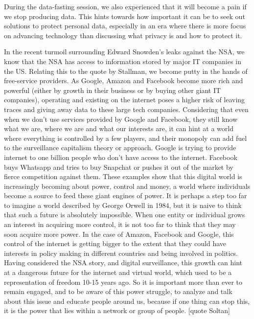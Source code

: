 \documentclass[format=acmsmall, review=false, screen=true]{acmart}
\begin{document}
During the data-fasting session, we also experienced that it will become a pain if we stop producing data. This hints towards how important it can be to seek out solutions to protect personal data, especially in an era where there is more focus on advancing technology than discussing what privacy is and how to protect it.

In the recent turmoil surrounding Edward Snowden’s leaks against the NSA, we know that the NSA has access to information stored by major IT companies in the US. Relating this to the quote by Stallman, we become putty in the hands of free-service providers. As Google, Amazon and Facebook become more rich and powerful (either by growth in their business or by buying other giant IT companies), operating and existing on the internet poses a higher risk of leaving traces and giving away data to these large tech companies. Considering that even when we don’t use services provided by Google and Facebook, they still know what we are, where we are and what our interests are, it can hint at a world where everything is controlled by a few players, and their monopoly can add fuel to the surveillance capitalism theory or approach. Google is trying to provide internet to one billion people who don’t have access to the internet. Facebook buys Whatsapp and tries to buy Snapchat or pushes it out of the market by fierce competition against them. These examples show that this digital world is increasingly becoming about power, control and money, a world where individuals become a source to feed these giant engines of power. It is perhaps a step too far to imagine a world described by George Orwell in 1984, but it is naive to think that such a future is absolutely impossible. When one entity or individual grows an interest in acquiring more control, it is not too far to think that they may soon acquire more power. In the case of Amazon, Facebook and Google, this control of the internet is getting bigger to the extent that they could have interests in policy making in different countries and being involved in politics. Having considered the NSA story, and digital surveillance, this growth can hint at a dangerous future for the internet and virtual world, which used to be a representation of freedom 10-15 years ago. So it is important more than ever to remain engaged, and to be aware of this power struggle, to analyze and talk about this issue and educate people around us, because if one thing can stop this, it is the power that lies within a network or group of people. [quote Soltan]
\end{document}
